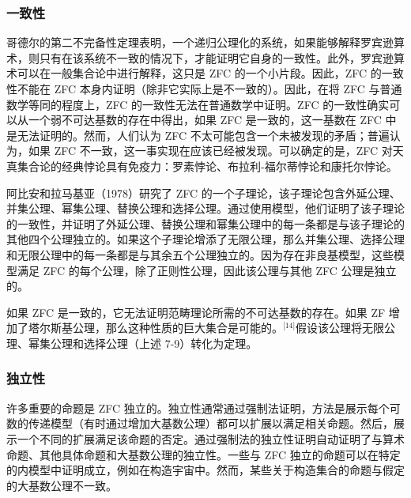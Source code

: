 \subsubsection{一致性} 
哥德尔的第二不完备性定理表明，一个递归公理化的系统，如果能够解释罗宾逊算术，则只有在该系统不一致的情况下，才能证明它自身的一致性。此外，罗宾逊算术可以在一般集合论中进行解释，这只是 ZFC 的一个小片段。因此，ZFC 的一致性不能在 ZFC 本身内证明（除非它实际上是不一致的）。因此，在将 ZFC 与普通数学等同的程度上，ZFC 的一致性无法在普通数学中证明。ZFC 的一致性确实可以从一个弱不可达基数的存在中得出，如果 ZFC 是一致的，这一基数在 ZFC 中是无法证明的。然而，人们认为 ZFC 不太可能包含一个未被发现的矛盾；普遍认为，如果 ZFC 不一致，这一事实现在应该已经被发现。可以确定的是，ZFC 对天真集合论的经典悖论具有免疫力：罗素悖论、布拉利-福尔蒂悖论和康托尔悖论。

阿比安和拉马基亚（1978）研究了 ZFC 的一个子理论，该子理论包含外延公理、并集公理、幂集公理、替换公理和选择公理。通过使用模型，他们证明了该子理论的一致性，并证明了外延公理、替换公理和幂集公理中的每一条都是与该子理论的其他四个公理独立的。如果这个子理论增添了无限公理，那么并集公理、选择公理和无限公理中的每一条都是与其余五个公理独立的。因为存在非良基模型，这些模型满足 ZFC 的每个公理，除了正则性公理，因此该公理与其他 ZFC 公理是独立的。

如果 ZFC 是一致的，它无法证明范畴理论所需的不可达基数的存在。如果 ZF 增加了塔尔斯基公理，那么这种性质的巨大集合是可能的。\(^\text{[14]}\)假设该公理将无限公理、幂集公理和选择公理（上述 7-9）转化为定理。
\subsubsection{独立性} 
许多重要的命题是 ZFC 独立的。独立性通常通过强制法证明，方法是展示每个可数的传递模型（有时通过增加大基数公理）都可以扩展以满足相关命题。然后，展示一个不同的扩展满足该命题的否定。通过强制法的独立性证明自动证明了与算术命题、其他具体命题和大基数公理的独立性。一些与 ZFC 独立的命题可以在特定的内模型中证明成立，例如在构造宇宙中。然而，某些关于构造集合的命题与假定的大基数公理不一致。

